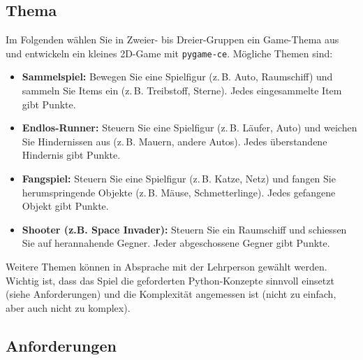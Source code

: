 \subsection{Thema}
Im Folgenden wählen Sie in Zweier- bis Dreier-Gruppen ein Game-Thema aus und entwickeln ein kleines 2D-Game mit \texttt{pygame-ce}. Mögliche Themen sind:
\begin{itemize}
    \item \textbf{Sammelspiel:} Bewegen Sie eine Spielfigur (z.\,B. Auto, Raumschiff) und sammeln Sie Items ein (z.\,B. Treibstoff, Sterne). Jedes eingesammelte Item gibt Punkte.
    \item \textbf{Endlos-Runner:} Steuern Sie eine Spielfigur (z.\,B. Läufer, Auto) und weichen Sie Hindernissen aus (z.\,B. Mauern, andere Autos). Jedes überstandene Hindernis gibt Punkte.
    \item \textbf{Fangspiel:} Steuern Sie eine Spielfigur (z.\,B. Katze, Netz) und fangen Sie herumspringende Objekte (z.\,B. Mäuse, Schmetterlinge). Jedes gefangene Objekt gibt Punkte.
    \item \textbf{Shooter (z.B. Space Invader):} Steuern Sie ein Raumschiff und schiessen Sie auf herannahende Gegner. Jeder abgeschossene Gegner gibt Punkte.
\end{itemize}

Weitere Themen können in Absprache mit der Lehrperson gewählt werden. Wichtig ist, dass das Spiel die geforderten Python-Konzepte sinnvoll einsetzt (siehe Anforderungen) und die Komplexität angemessen ist (nicht zu einfach, aber auch nicht zu komplex).

\subsection{Anforderungen}

